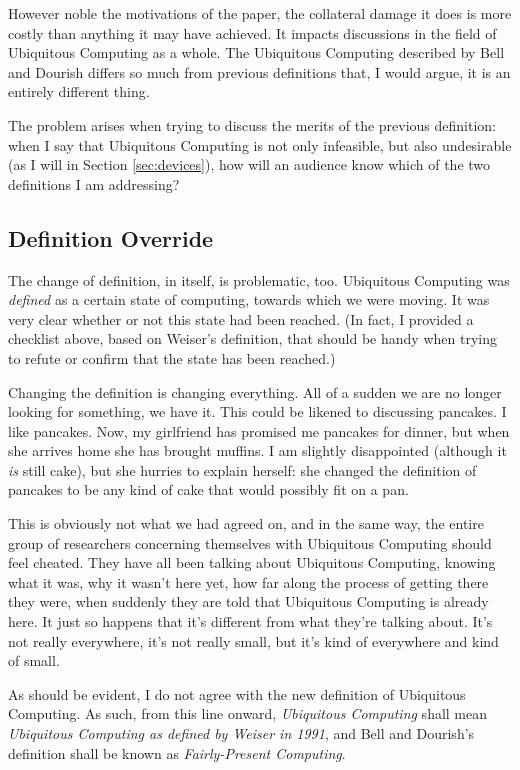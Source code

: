 However noble the motivations of the paper, the collateral damage it does is more costly than anything it may have
achieved. It impacts discussions in the field of Ubiquitous Computing as a whole. The Ubiquitous Computing described
by Bell and Dourish differs so much from previous definitions that, I would argue, it is an entirely different
thing.

The problem arises when trying to discuss the merits of the previous definition: when I say that Ubiquitous
Computing is not only infeasible, but also undesirable (as I will in Section \ref{sec:devices}), how will an audience
know which of the two definitions I am addressing?

\subsection*{Definition Override}

The change of definition, in itself, is problematic, too. Ubiquitous Computing was \emph{defined} as a certain state
of computing, towards which we were moving. It was very clear whether or not this state had been reached. (In fact,
I provided a checklist above, based on Weiser's definition, that should be handy when trying to refute or confirm that
the state has been reached.)

Changing the definition is changing everything. All of a sudden we are no longer looking
for something, we have it. This could be likened to discussing pancakes. I like pancakes. Now, my girlfriend has
promised me pancakes for dinner, but when she arrives home she has brought muffins. I am slightly disappointed (although
it \emph{is} still cake), but she hurries to explain herself: she changed the definition of pancakes to be any kind
of cake that would possibly fit on a pan.

This is obviously not what we had agreed on, and in the same way, the entire
group of researchers concerning themselves with Ubiquitous Computing should feel cheated. They have all been talking
about Ubiquitous Computing, knowing what it was, why it wasn't here yet, how far along the process of getting there
they were, when suddenly they are told that Ubiquitous Computing is already here. It just so happens that it's different
from what they're talking about. It's not really everywhere, it's not really small, but it's kind of everywhere and kind
of small.

As should be evident, I do not agree with the new definition of Ubiquitous Computing. As such, from this line onward,
\emph{Ubiquitous Computing} shall mean \emph{Ubiquitous Computing as defined by Weiser in 1991}, and Bell and Dourish's
definition shall be known as \emph{Fairly-Present Computing}.